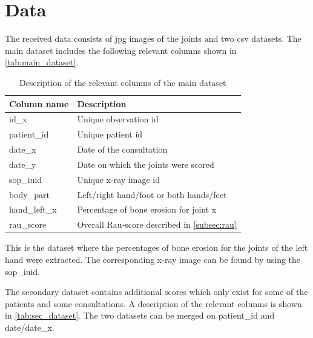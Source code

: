 \documentclass[12pt]{article}
\begin{document}
\newpage
\section{Data}
\label{sec:data}

The received data consists of jpg images of the joints and two csv datasets. The main dataset includes the following relevant columns shown in \autoref{tab:main_dataset}.

\begin{table}[ht]
\centering
\caption{Description of the relevant columns of the main dataset}
\label{tab:main_dataset}
\begin{tabular}{@{}ll@{}}
\toprule
Column name   & Description                                           \\ \midrule
id\_x         & Unique observation id                                 \\
patient\_id   & Unique patient id                                     \\
date\_x       & Date of the consultation                              \\
date\_y       & Date on which the joints were scored                  \\
sop\_iuid     & Unique x-ray image id                                 \\
body\_part    & Left/right hand/foot or both hands/feet               \\
hand\_left\_x & Percentage of bone erosion for joint x                \\
rau\_score    & Overall Rau-score described in \autoref{subsec:rau} \\ \bottomrule
\end{tabular}
\end{table}

This is the dataset where the percentages of bone erosion for the joints of the left hand were extracted. The corresponding x-ray image can be found by using the sop\_iuid.

The secondary dataset contains additional scores which only exist for some of the patients and some consultations. A description of the relevant columns is shown in \autoref{tab:sec_dataset}. The two datasets can be merged on patient\_id and date/date\_x.
\end{document}
